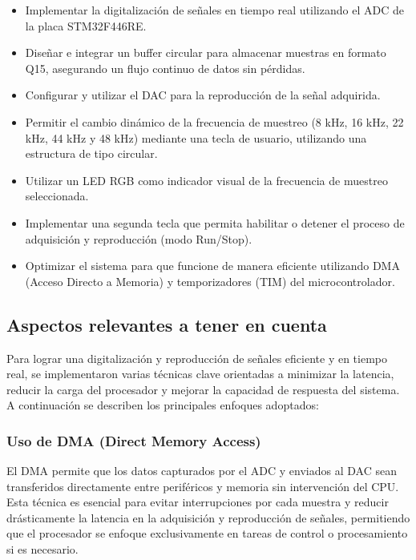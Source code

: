 \documentclass[12pt]{article}
\begin{document}
	\begin{itemize}
		 \item Implementar la digitalización de señales en tiempo real utilizando el ADC de la placa STM32F446RE.
		 
		 \item Diseñar e integrar un buffer circular para almacenar muestras en formato Q15, asegurando un flujo continuo de datos sin pérdidas.
		 
		 \item Configurar y utilizar el DAC para la reproducción de la señal adquirida.
		 
		 \item Permitir el cambio dinámico de la frecuencia de muestreo (8 kHz, 16 kHz, 22 kHz, 44 kHz y 48 kHz) mediante una tecla de usuario, utilizando una estructura de tipo circular.
		 
		 \item Utilizar un LED RGB como indicador visual de la frecuencia de muestreo seleccionada.
		 
		 \item Implementar una segunda tecla que permita habilitar o detener el proceso de adquisición y reproducción (modo Run/Stop).
		 
		 \item Optimizar el sistema para que funcione de manera eficiente utilizando DMA (Acceso Directo a Memoria) y temporizadores (TIM) del microcontrolador.
	\end{itemize}
	
	\subsection{Aspectos relevantes a tener en cuenta}
	Para lograr una digitalización y reproducción de señales eficiente y en tiempo real, se implementaron varias técnicas clave orientadas a minimizar la latencia, reducir la carga del procesador y mejorar la capacidad de respuesta del sistema. A continuación se describen los principales enfoques adoptados:
	
	\subsubsection{Uso de DMA (Direct Memory Access)}
	El DMA permite que los datos capturados por el ADC y enviados al DAC sean transferidos directamente entre periféricos y memoria sin intervención del CPU. Esta técnica es esencial para evitar interrupciones por cada muestra y reducir drásticamente la latencia en la adquisición y reproducción de señales, permitiendo que el procesador se enfoque exclusivamente en tareas de control o procesamiento si es necesario.\newpage
	
\end{document}
